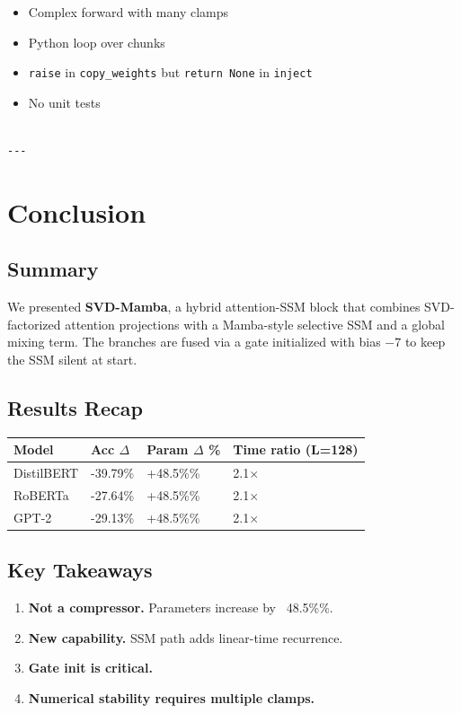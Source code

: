 \begin{itemize}
\item Complex forward with many clamps
\item Python loop over chunks
\item \texttt{raise} in \texttt{copy\_weights} but \texttt{return None} in \texttt{inject}
\item No unit tests
\end{itemize}
\begin{lstlisting}

---
\end{lstlisting}


\section{Conclusion}

\subsection{Summary}

We presented \textbf{SVD-Mamba}, a hybrid attention-SSM block that combines 
SVD-factorized attention projections with a Mamba-style selective SSM and 
a global mixing term. The branches are fused via a gate initialized with 
bias $-7$ to keep the SSM silent at start.

\subsection{Results Recap}

\begin{table}[H]
\centering
\small
\begin{tabular}{llll}
\toprule
\textbf{Model} & \textbf{Acc $\Delta$} & \textbf{Param $\Delta$ \%} & \textbf{Time ratio (L=128)} \\
\midrule
DistilBERT & -39.79\% & +48.5\%\% & 2.1$\times$ \\
RoBERTa & -27.64\% & +48.5\%\% & 2.1$\times$ \\
GPT-2 & -29.13\% & +48.5\%\% & 2.1$\times$ \\
\bottomrule
\end{tabular}
\end{table}

\subsection{Key Takeaways}

\begin{enumerate}
\item \textbf{Not a compressor.} Parameters increase by ~48.5\%\%.
\item \textbf{New capability.} SSM path adds linear-time recurrence.
\item \textbf{Gate init is critical.}
\item \textbf{Numerical stability requires multiple clamps.}

\end{enumerate}
